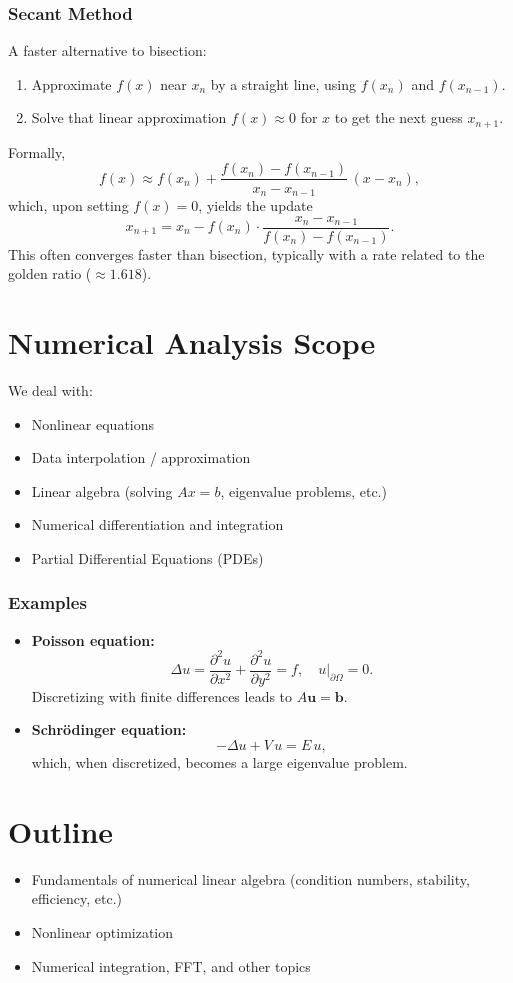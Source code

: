\documentclass[12pt]{article}
\begin{document}
\subsubsection*{Secant Method}
A faster alternative to bisection:
\begin{enumerate}
    \item Approximate $f(x)$ near $x_n$ by a straight line, using $f(x_n)$ and $f(x_{n-1})$.
    \item Solve that linear approximation $f(x) \approx 0$ for $x$ to get the next guess $x_{n+1}$.
\end{enumerate}
Formally,
\[
f(x) \approx f(x_n) + \frac{f(x_n) - f(x_{n-1})}{x_n - x_{n-1}} \, (x - x_n),
\]
which, upon setting $f(x) = 0$, yields the update
\[
x_{n+1} = x_n - f(x_n) \cdot \frac{x_n - x_{n-1}}{f(x_n) - f(x_{n-1})}.
\]
This often converges faster than bisection, typically with a rate related to the golden ratio ($\approx 1.618$).

\section*{Numerical Analysis Scope}
We deal with:
\begin{itemize}
    \item Nonlinear equations
    \item Data interpolation / approximation
    \item Linear algebra (solving $A x = b$, eigenvalue problems, etc.)
    \item Numerical differentiation and integration
    \item Partial Differential Equations (PDEs)
\end{itemize}

\subsubsection*{Examples}
\begin{itemize}
    \item \textbf{Poisson equation:}
    \[
    \Delta u = \frac{\partial^2 u}{\partial x^2} + \frac{\partial^2 u}{\partial y^2} = f,
    \quad u\big|_{\partial \Omega} = 0.
    \]
    Discretizing with finite differences leads to $A\mathbf{u} = \mathbf{b}$.

    \item \textbf{Schr\"{o}dinger equation:}
    \[
    -\Delta u + V\,u = E\,u,
    \]
    which, when discretized, becomes a large eigenvalue problem.
\end{itemize}

\section*{Outline}
\begin{itemize}
    \item Fundamentals of numerical linear algebra (condition numbers, stability, efficiency, etc.)
    \item Nonlinear optimization
    \item Numerical integration, FFT, and other topics
\end{itemize}
\end{document}
